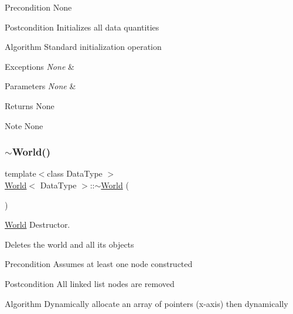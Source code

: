 \begin{DoxyPrecond}{Precondition}
None
\end{DoxyPrecond}
\begin{DoxyPostcond}{Postcondition}
Initializes all data quantities
\end{DoxyPostcond}
\begin{DoxyParagraph}{Algorithm}
Standard initialization operation
\end{DoxyParagraph}

\begin{DoxyExceptions}{Exceptions}
{\em None} & \\
\hline
\end{DoxyExceptions}

\begin{DoxyParams}{Parameters}
{\em None} & \\
\hline
\end{DoxyParams}
\begin{DoxyReturn}{Returns}
None
\end{DoxyReturn}
\begin{DoxyNote}{Note}
None 
\end{DoxyNote}
\hypertarget{class_world_a14051ba115660e37c5eba8c71f02bffd}{}\label{class_world_a14051ba115660e37c5eba8c71f02bffd} 
\subsubsection{\texorpdfstring{$\sim$\+World()}{~World()}}
{\footnotesize\ttfamily template$<$class Data\+Type $>$ \\
\hyperlink{class_world}{World}$<$ Data\+Type $>$\+::$\sim$\hyperlink{class_world}{World} (\begin{DoxyParamCaption}{ }\end{DoxyParamCaption})}



\hyperlink{class_world}{World} Destructor. 

Deletes the world and all its objects

\begin{DoxyPrecond}{Precondition}
Assumes at least one node constructed
\end{DoxyPrecond}
\begin{DoxyPostcond}{Postcondition}
All linked list nodes are removed
\end{DoxyPostcond}
\begin{DoxyParagraph}{Algorithm}
Dynamically allocate an array of pointers (x-\/axis) then dynamically
\end{DoxyParagraph}

